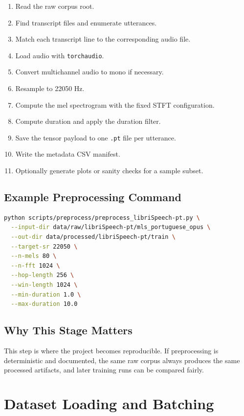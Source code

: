 \documentclass[11pt]{article}
\newcommand{\pathtt}[1]{\texttt{#1}}
\begin{document}
\begin{enumerate}[leftmargin=1.5em]
  \item Read the raw corpus root.
  \item Find transcript files and enumerate utterances.
  \item Match each transcript line to the corresponding audio file.
  \item Load audio with \pathtt{torchaudio}.
  \item Convert multichannel audio to mono if necessary.
  \item Resample to 22050 Hz.
  \item Compute the mel spectrogram with the fixed STFT configuration.
  \item Compute duration and apply the duration filter.
  \item Save the tensor payload to one \pathtt{.pt} file per utterance.
  \item Write the metadata CSV manifest.
  \item Optionally generate plots or sanity checks for a sample subset.
\end{enumerate}

\subsection{Example Preprocessing Command}

\begin{lstlisting}[language=bash]
python scripts/preprocess/preprocess_libriSpeech-pt.py \
  --input-dir data/raw/libriSpeech-pt/mls_portuguese_opus \
  --out-dir data/processed/libriSpeech-pt/train \
  --target-sr 22050 \
  --n-mels 80 \
  --n-fft 1024 \
  --hop-length 256 \
  --win-length 1024 \
  --min-duration 1.0 \
  --max-duration 10.0
\end{lstlisting}

\subsection{Why This Stage Matters}

This step is where the project becomes reproducible. If preprocessing is deterministic and documented, the same raw corpus always produces the same processed artifacts, and later training runs can be compared fairly.

\section{Dataset Loading and Batching}
\end{document}

